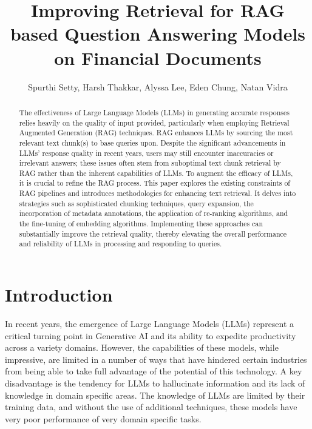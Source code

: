 \documentclass{article}
\title{Improving Retrieval for RAG based Question Answering Models on Financial Documents}
\author{Spurthi Setty, Harsh Thakkar, Alyssa Lee, Eden Chung, Natan Vidra }
\date{}
\begin{document}
\maketitle

\begin{abstract} 
\noindent 
The effectiveness of Large Language Models (LLMs) in generating accurate responses relies heavily on the quality of input provided, particularly when employing Retrieval Augmented Generation (RAG) techniques. RAG enhances LLMs by sourcing the most relevant text chunk(s) to base queries upon. Despite the significant advancements in LLMs' response quality in recent years, users may still encounter inaccuracies or irrelevant answers; these issues often stem from suboptimal text chunk retrieval by RAG rather than the inherent capabilities of LLMs. To augment the efficacy of LLMs, it is crucial to refine the RAG process. This paper explores the existing constraints of RAG pipelines and introduces methodologies for enhancing text retrieval. It delves into strategies such as sophisticated chunking techniques, query expansion, the incorporation of metadata annotations, the application of re-ranking algorithms, and the fine-tuning of embedding algorithms. Implementing these approaches can substantially improve the retrieval quality, thereby elevating the overall performance and reliability of LLMs in processing and responding to queries.

\end{abstract}


\section{Introduction}
    In recent years, the emergence of Large Language Models (LLMs) represent a critical turning point in Generative AI and its ability to expedite productivity across a variety domains. However, the capabilities of these models, while impressive, are limited in a number of ways that have hindered certain industries from being able to take full advantage of the potential of this technology. A key disadvantage is the tendency for LLMs to hallucinate information and its lack of knowledge in domain specific areas. The knowledge of LLMs are limited by their training data, and without the use of additional techniques, these models have very poor performance of very domain specific tasks. 
    \\
    
\end{document}
